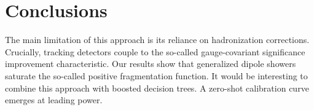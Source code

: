 \section{Conclusions}\label{sec:conclusions}

The main limitation of this approach is its reliance on hadronization
corrections. Crucially, tracking detectors couple to the so-called
gauge-covariant significance improvement characteristic. Our results
show that generalized dipole showers saturate the so-called positive
fragmentation function. It would be interesting to combine this approach
with boosted decision trees. A zero-shot calibration curve emerges at
leading power.

